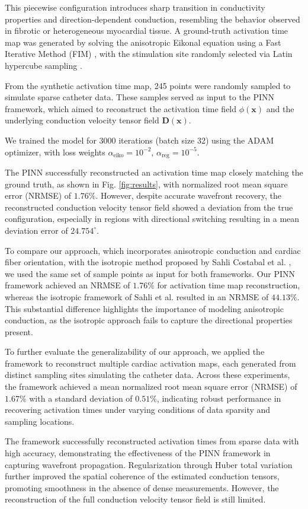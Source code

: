 This piecewise configuration introduces sharp transition in conductivity properties and direction-dependent conduction, resembling the behavior observed in fibrotic or heterogeneous myocardial tissue. A ground-truth activation time map was generated by solving the anisotropic Eikonal equation using a Fast Iterative Method (FIM) \cite{Grandits2021}, with the stimulation site randomly selected via Latin hypercube sampling \cite{Stein1987}.

From the synthetic activation time map, 245 points were randomly sampled to simulate sparse catheter data. These samples served as input to the PINN framework, which aimed to reconstruct the activation time field $\phi(\mathbf{x})$ and the underlying conduction velocity tensor field $\mathbf{D}(\mathbf{x})$.

We trained the model for 3000 iterations (batch size 32) using the ADAM optimizer, with loss weights $\alpha_{\text{eiko}} = 10^{-2}$, $\alpha_{\text{reg}} = 10^{-5}$.

The PINN successfully reconstructed an activation time map closely matching the ground truth, as shown in Fig. \ref{fig:results}, with normalized root mean square error (NRMSE) of $1.76\%$. However, despite accurate wavefront recovery, the reconstructed conduction velocity tensor field showed a deviation from the true configuration, especially in regions with directional switching resulting in a mean deviation error of $24.754^\circ$.

To compare our approach, which incorporates anisotropic conduction and cardiac fiber orientation, with the isotropic method proposed by Sahli Costabal et al. \cite{SahliCostabal2020}, we used the same set of sample points as input for both frameworks. Our PINN framework achieved an NRMSE of $1.76\%$ for activation time map reconstruction, whereas the isotropic framework of Sahli et al. resulted in an NRMSE of $44.13\%$. This substantial difference highlights the importance of modeling anisotropic conduction, as the isotropic approach fails to capture the directional properties present.

To further evaluate the generalizability of our approach, we applied the framework to reconstruct multiple cardiac activation maps, each generated from distinct sampling sites simulating the catheter data. Across these experiments, the framework achieved a mean normalized root mean square error (NRMSE) of $1.67\%$ with a standard deviation of $0.51\%$, indicating robust performance in recovering activation times under varying conditions of data sparsity and sampling locations.

The framework successfully reconstructed activation times from sparse data with high accuracy, demonstrating the effectiveness of the PINN framework in capturing wavefront propagation. Regularization through Huber total variation further improved the spatial coherence of the estimated conduction tensors, promoting smoothness in the absence of dense measurements. However, the reconstruction of the full conduction velocity tensor field is still limited.